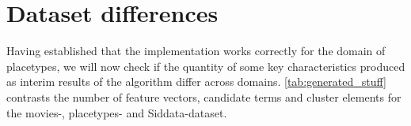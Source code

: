 


\section{Dataset differences} %
\label{sec:results_datasetdiffs}


Having established that the implementation works correctly for the domain of placetypes, we will now check if the quantity of some key characteristics produced as interim results of the algorithm differ across domains. \autoref{tab:generated_stuff} contrasts the number of feature vectors, candidate terms and cluster elements for the movies-, placetypes- and Siddata-dataset.


